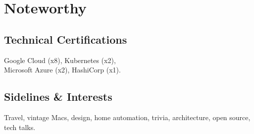 \documentclass[]{cvpn}
\begin{document}
\begin{multicols}{2}
\begin{eventlist}
\end{eventlist}

\section{Noteworthy}

\subsection{Technical Certifications}
Google Cloud (x8), Kubernetes (x2),\\Microsoft Azure (x2), HashiCorp (x1).
\\




\subsection{Sidelines \& Interests}
Travel, vintage Macs, design, home automation,
trivia, architecture, open source, tech talks.


\end{multicols}
\end{document}

